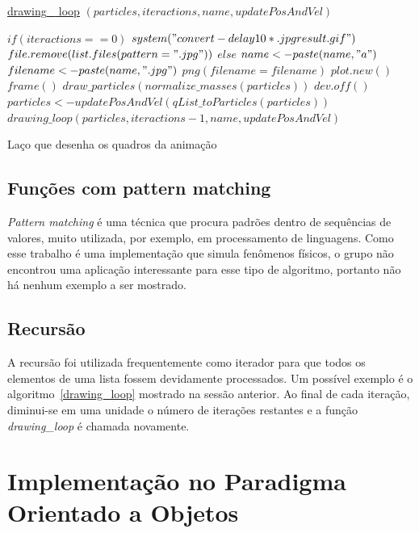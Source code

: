 \documentclass[rel_mlp]{iiufrgs}
\begin{document}
    \begin{algorithm}
	  \label{drawing_loop}
    \underline{drawing{\_}
loop} $(particles, iteractions, name, updatePosAndVel)$\;

  $if (iteractions == 0) $\;
  $  system("convert -delay 10 *.jpg result.gif") $\;
  $  file.remove(list.files(pattern=".jpg")) $\;
  $else $\;
  $  name <- paste(name, "a") $\;
  $  filename <- paste(name, ".jpg") $\;
  $  png(filename = filename) $\;
  $  plot.new() $\;
  $  frame() $\;
  $  draw{\_}particles(normalize{\_}masses(particles)) $\;
  $  dev.off() $\;
  $  particles <- updatePosAndVel(qList{\_}toParticles(particles)) $\;
  $  drawing{\_}loop(particles, iteractions-1, name, updatePosAndVel) $\;
    \caption{Laço que desenha os quadros da animação}
    \end{algorithm}

    \subsection{Funções com pattern matching}

    \textit{Pattern matching} é uma técnica que procura padrões dentro de sequências de valores, muito utilizada, por exemplo, em processamento de linguagens. Como esse trabalho é uma implementação que simula fenômenos físicos, o grupo não encontrou uma aplicação interessante para esse tipo de algoritmo, portanto não há nenhum exemplo a ser mostrado.

    \subsection{Recursão}

      A recursão foi utilizada frequentemente como iterador para que todos os elementos de uma lista
      fossem devidamente processados. Um possível exemplo é o algoritmo~\ref{drawing_loop}
      mostrado na sessão anterior. Ao final de cada iteração, diminui-se em uma unidade o número de iterações
      restantes e a função \textit{drawing{\_}loop} é chamada novamente.


\section{Implementação no Paradigma Orientado a Objetos}
\end{document}
